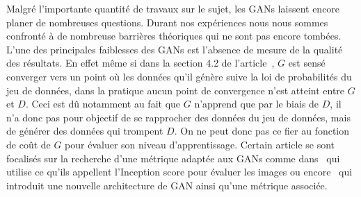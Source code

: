 \documentclass[11pt,francais]{article}
\begin{document}
Malgré l'importante quantité de travaux sur le sujet, les GANs laissent encore planer de nombreuses questions. 
Durant nos expériences nous nous sommes confronté à de nombreuse barrières théoriques qui ne sont pas encore tombées.\\
L'une des principales faiblesses des GANs est l'absence de mesure de la qualité des résultats. En effet même si dans la section 4.2 de l'article~\cite{NIPS2014_5423}, \(G\) est sensé converger vers un point où les données qu'il génère suive la loi de probabilités du jeu de données, dans la pratique aucun point de convergence n'est atteint entre \(G\) et \(D\). Ceci est dû notamment au fait que \(G\) n'apprend que par le biais de \(D\), il n'a donc pas pour objectif de se rapprocher des données du jeu de données, mais de générer des données qui trompent \(D\). On ne peut donc pas ce fier au fonction de coût de \(G\) pour évaluer son niveau d'apprentissage. 
Certain article se sont focalisés sur la recherche d'une métrique adaptée aux GANs comme dans~\cite{salimans2016improved} qui utilise ce qu'ils appellent l'Inception score pour évaluer les images ou encore~\cite{berthelot2017began} qui introduit une nouvelle architecture de GAN ainsi qu'une métrique associée.\\
\end{document}

